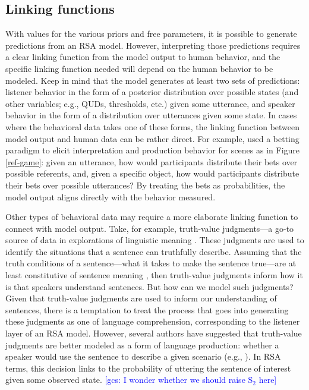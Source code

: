 \documentclass{sp}
\newcommand{\gcs}[1]{\textcolor{blue}{[gcs: #1]}}
\begin{document}
\subsection{Linking functions}

With values for the various priors and free parameters, it is possible to generate predictions from an RSA model. However, interpreting those predictions requires a clear linking function from the model output to human behavior, and the specific linking function needed will depend on the human behavior to be modeled. Keep in mind that the model generates at least two sets of predictions: listener behavior in the form of a posterior distribution over possible states (and other variables; e.g., QUDs, thresholds, etc.) given some utterance, and speaker behavior in the form of a distribution over utterances given some state. In cases where the behavioral data takes one of these forms, the linking function between model output and human data can be rather direct. For example, \cite{frankgoodman2012} used a betting paradigm to elicit interpretation and production behavior for scenes as in Figure \ref{ref-game}: given an utterance, how would participants distribute their bets over possible referents, and, given a specific object, how would participants distribute their bets over possible utterances? By treating the bets as probabilities, the model output aligns directly with the behavior measured. 

Other types of behavioral data may require a more elaborate linking function to connect with model output. Take, for example, truth-value judgments---a go-to source of data in explorations of linguistic meaning \citep{crainmckee1985,crainthornton1998}. These judgments are used to identify the situations that a sentence can truthfully describe. Assuming that the truth conditions of a sentence---what it takes to make the sentence true---are at least constitutive of sentence meaning \citep[e.g.,][]{chierchiamcconnellginet2000}, then truth-value judgments inform how it is that speakers understand sentences. But how can we model such judgments? Given that truth-value judgments are used to inform our understanding of sentences, there is a temptation to treat the process that goes into generating these judgments as one of language comprehension, corresponding to the listener layer of an RSA model. However, several authors have suggested that truth-value judgments are better modeled as a form of language production: whether a speaker would use the sentence to describe a given scenario (e.g., \citealp{degengoodman2014,savinellietal2017,tesslergoodman2019, jasbietal2019}). In RSA terms, this decision links to the probability of uttering the sentence of interest given some observed state. \gcs{I wonder whether we should raise S$_2$ here}
\end{document}
